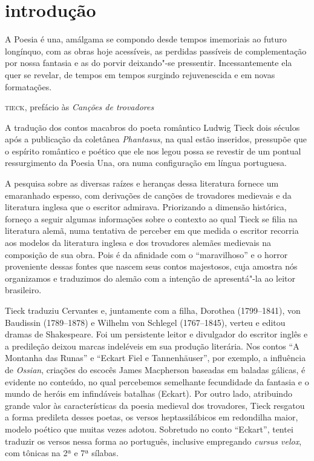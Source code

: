 \chapter[Introdução, por Maria Aparecida Barbosa]{introdução}

\epigraph{A Poesia é una, amálgama se compondo desde tempos imemoriais
ao futuro longínquo, com as obras hoje acessíveis, as perdidas passíveis
de complementação por nossa fantasia e as do porvir deixando"-se pressentir. 
Incessantemente ela quer se revelar, de tempos em tempos surgindo rejuvenescida 
e em novas formatações.}{\textsc{tieck}, prefácio às \textit{Canções de trovadores}}

A tradução dos contos macabros do poeta romântico Ludwig Tieck dois
séculos após a publicação da coletânea \textit{Phantasus}, na qual estão
inseridos, pressupõe que o espírito romântico e poético que ele nos 
legou possa se revestir de um pontual ressurgimento da
Poesia Una, ora numa configuração em língua portuguesa. 

A pesquisa sobre as diversas raízes e heranças dessa literatura fornece
um emaranhado espesso, com derivações de canções de trovadores
medievais e da literatura inglesa que o escritor admirava. Priorizando
a dimensão histórica, forneço a seguir algumas informações sobre o
contexto ao qual Tieck se filia na literatura alemã, numa
tentativa de perceber em que medida o escritor recorria aos modelos da
literatura inglesa e dos trovadores alemães medievais na composição de
sua obra. Pois é da afinidade com o ``maravilhoso'' e o horror
proveniente dessas fontes que nascem seus contos majestosos, cuja
amostra nós organizamos e traduzimos do alemão com a intenção de
apresentá"-la ao leitor brasileiro. 

Tieck traduziu Cervantes e, juntamente com a filha, Dorothea (1799--1841), 
von Baudissin (1789--1878) e Wilhelm von Schlegel (1767--1845), 
verteu e editou dramas de Shakespeare. Foi um persistente leitor e
divulgador do escritor inglês e a predileção deixou marcas indeléveis
em sua produção literária. Nos contos ``A Montanha das Runas'' e ``Eckart
Fiel e Tannenhäuser'', por exemplo, a influência de \textit{Ossian},
criações do escocês James Macpherson baseadas em baladas gálicas, é
evidente no conteúdo, no qual percebemos semelhante fecundidade da
fantasia e o mundo de heróis em infindáveis batalhas (Eckart). Por
outro lado, atribuindo grande valor às características da poesia
medieval dos trovadores, Tieck resgatou a forma predileta desses poetas,
os versos heptassilábicos em redondilha maior, modelo poético que
muitas vezes adotou. Sobretudo no conto ``Eckart'', tentei traduzir 
os versos nessa forma ao português, inclusive
empregando \textit{cursus velox}, com tônicas na 2ª e 7ª sílabas.

